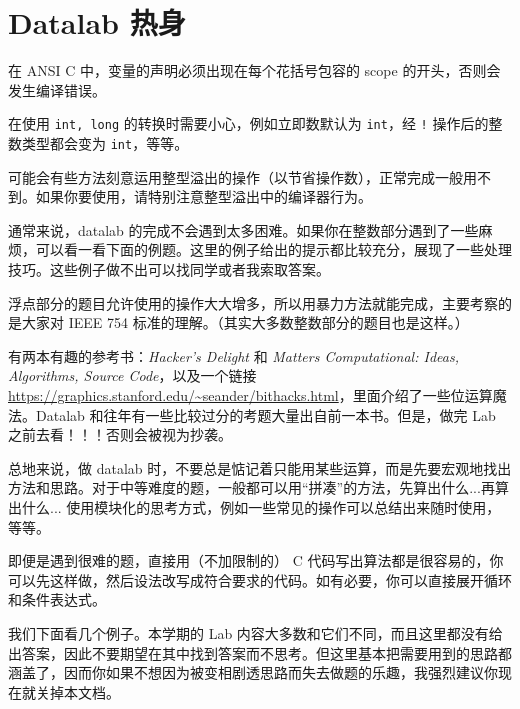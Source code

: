 \chapter{Datalab 热身}
    \begin{help}
        \begin{compactitem}
            \item 在 ANSI C 中，变量的声明必须出现在每个花括号包容的 scope 的开头，否则会发生编译错误。
            \item 在使用 \texttt{int, long} 的转换时需要小心，例如立即数默认为 \texttt{int}，经 \texttt{!} 操作后的整数类型都会变为 \texttt{int}，等等。
            \item 可能会有些方法刻意运用整型溢出的操作（以节省操作数），正常完成一般用不到。如果你要使用，请特别注意整型溢出中的编译器行为。
            \item 通常来说，datalab 的完成不会遇到太多困难。如果你在整数部分遇到了一些麻烦，可以看一看下面的例题。这里的例子给出的提示都比较充分，展现了一些处理技巧。这些例子做不出可以找同学或者我索取答案。
            \item 浮点部分的题目允许使用的操作大大增多，所以用暴力方法就能完成，主要考察的是大家对 IEEE 754 标准的理解。（其实大多数整数部分的题目也是这样。）
            \item 有两本有趣的参考书：\textit{Hacker's Delight} 和 \textit{Matters Computational: Ideas, Algorithms, Source Code}，以及一个链接 \url{https://graphics.stanford.edu/~seander/bithacks.html}，里面介绍了一些位运算魔法。Datalab 和往年有一些比较过分的考题大量出自前一本书。但是，做完 Lab 之前去看！！！否则会被视为抄袭。 
        \end{compactitem}
    \end{help}

    总地来说，做 datalab 时，不要总是惦记着只能用某些运算，而是先要宏观地找出方法和思路。对于中等难度的题，一般都可以用“拼凑”的方法，先算出什么...再算出什么... 使用模块化的思考方式，例如一些常见的操作可以总结出来随时使用，等等。
    
    即便是遇到很难的题，直接用（不加限制的） C 代码写出算法都是很容易的，你可以先这样做，然后设法改写成符合要求的代码。如有必要，你可以直接展开循环和条件表达式。

    我们下面看几个例子。本学期的 Lab 内容大多数和它们不同，而且这里都没有给出答案，因此不要期望在其中找到答案而不思考。但这里基本把需要用到的思路都涵盖了，因而你如果不想因为被变相剧透思路而失去做题的乐趣，我强烈建议你现在就关掉本文档。

